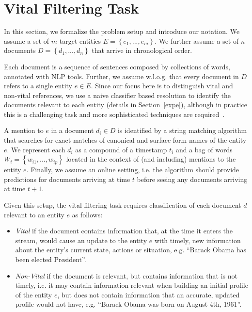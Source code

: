 \documentclass{article}
\begin{document}
\section{Vital Filtering Task}
\label{background}

In this section, we formalize the problem setup and introduce our notation. 
We assume a set of $m$ target entities $E = \left\{ {e_1, ..., e_m}\right\}$. We further assume a set of $n$ documents $D = \left\{ {d_{1}, ..., d_{n}}\right\}$ that arrive in chronological order. 
 
Each document is a sequence of sentences composed by collections of words, annotated with NLP tools.
Further, we assume w.l.o.g. that every document in $D$ refers to a single entity $e \in E$. %
Since our focus here is to distinguish vital and non-vital references, we use a naive classifier based resolution to identify the documents relevant to each entity (details in Section~\ref{expe}), although in practice this is a challenging task and more sophisticated techniques are required~\citep{RaoMD10,singh11:acl}.

A mention to $e$ in a document $d_i \in D$ is identified by a string matching algorithm that searches for exact matches of canonical and surface form names of the entity $e$.
We represent each $d_i$ as a compound of a timestamp $t_i$ and a bag of words $W_i = \left\{ {w_{i1}, ..., w_{ip}}\right\}$ located in the context of (and including) mentions to the entity $e$. 
Finally, we assume an online setting, i.e. the algorithm should provide predictions for documents arriving at time $t$ before seeing any documents arriving at time $t+1$.

Given this setup, the vital filtering task requires classification of each document $d$ relevant to an entity $e$ as follows:
\begin{itemize}
    \item \emph{Vital} if the document contains information that, at the time it enters the stream, would cause an update to the entity $e$ with timely, new information about the entity's current state, actions or situation, e.g. ``Barack Obama has been elected President''.
    \item \emph{Non-Vital} if the document is relevant, but contains information that is not timely, i.e. it may contain information relevant when building an initial profile of the entity $e$, but does not contain information that an accurate, updated profile would not have, e.g. ``Barack Obama was born on August 4th, 1961''.
\end{itemize}
\end{document}
